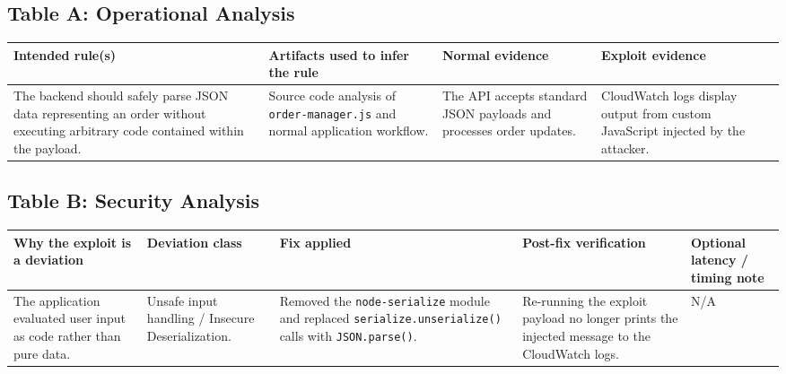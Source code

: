 \documentclass[12pt]{report}
\begin{document}
\subsection*{Table A: Operational Analysis}
\begin{table}[H]
  \small
  \centering
  \begin{tabularx}{\textwidth}{|Y|Y|Y|Y|}
    \hline
    \textbf{Intended rule(s)} & \textbf{Artifacts used to infer the rule} & \textbf{Normal evidence} & \textbf{Exploit evidence} \\
    \hline
    The backend should safely parse JSON data representing an order without executing arbitrary code contained within the payload. &
    Source code analysis of \nolinkurl{order-manager.js} and normal application workflow. &
    The API accepts standard JSON payloads and processes order updates. &
    CloudWatch logs display output from custom JavaScript injected by the attacker. \\
    \hline
  \end{tabularx}
\end{table}

\subsection*{Table B: Security Analysis}
\begin{table}[H]
  \footnotesize
  \centering
  \begin{tabularx}{\textwidth}{|Y|Y|Y|Y|Y|}
    \hline
    \textbf{Why the exploit is a deviation} & \textbf{Deviation class} & \textbf{Fix applied} & \textbf{Post-fix verification} & \textbf{Optional latency / timing note} \\
    \hline
    The application evaluated user input as code rather than pure data. &
    Unsafe input handling / Insecure Deserialization. &
    Removed the \nolinkurl{node-serialize} module and replaced \nolinkurl{serialize.unserialize()} calls with \nolinkurl{JSON.parse()}. &
    Re-running the exploit payload no longer prints the injected message to the CloudWatch logs. &
    N/A \\
    \hline
  \end{tabularx}
\end{table}
\end{document}
